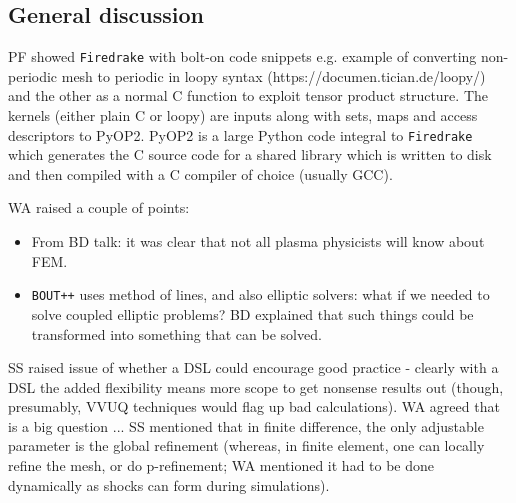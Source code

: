\documentclass[11pt]{article}
\begin{document}
\subsection{General discussion} \label{discussion}

PF showed {\tt Firedrake} with bolt-on code snippets e.g. example of converting 
non-periodic mesh to periodic in loopy syntax (https://documen.tician.de/loopy/)
and the other as a normal C function  to exploit tensor product structure.
The kernels (either plain C or loopy) are inputs along with sets, maps and
access descriptors to PyOP2. PyOP2 is a large Python code integral to
{\tt Firedrake} which generates the C source code for a shared library
which is written to disk and then compiled with a C compiler of choice (usually GCC).

WA raised a couple of points:

\begin{itemize}
\item From BD talk: it was clear that not all plasma physicists will know about 
FEM.
\item {\tt BOUT++} uses method of lines, and also elliptic solvers: what if we 
needed to solve coupled elliptic problems?  BD explained that such things could 
be transformed into something that can be solved.
\end{itemize}

SS raised issue of whether a DSL could encourage good practice - clearly with a 
DSL the added flexibility means more scope to get nonsense results out (though, 
presumably, VVUQ techniques would flag up bad calculations).  WA agreed that is 
a big question ... SS mentioned that in finite difference, the only adjustable 
parameter is the global refinement (whereas, in finite element, one can locally 
refine the mesh, or do p-refinement; WA mentioned it had to be done dynamically 
as shocks can form during simulations).
\end{document}
